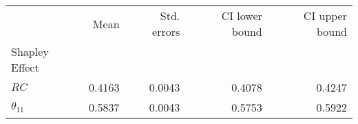 \begin{tabular}{lrrrr}
\toprule
{} &    Mean &  Std. errors &  CI lower bound &  CI upper bound \\
Shapley Effect &         &              &                 &                 \\
\midrule
$RC$           &  0.4163 &       0.0043 &          0.4078 &          0.4247 \\
$\theta_{11}$  &  0.5837 &       0.0043 &          0.5753 &          0.5922 \\
\bottomrule
\end{tabular}
